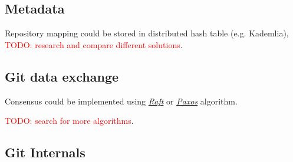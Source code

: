 \documentclass[12pt,oneside]{article}
\newcommand{\todo}[1]{\textcolor{red}{TODO: #1}}
\begin{document}
\subsection{Metadata}
Repository mapping could be stored in distributed hash table (e.g. Kademlia),
\todo{research and compare different solutions}.

\subsection{Git data exchange}
Consensus could be implemented using \emph{\href{https://raft.github.io/raft.pdf}{Raft}} or
\emph{\href{http://www.cs.yale.edu/homes/aspnes/pinewiki/Paxos.html}{Paxos}} algorithm.

\todo{search for more algorithms}.

\subsection{Git Internals}
\end{document}
